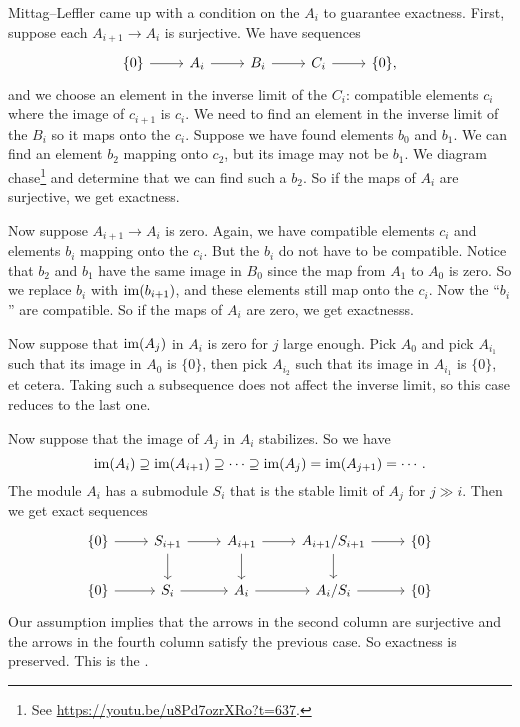 \documentclass[11pt, oneside,margin=1in]{article}
\begin{document}
Mittag--Leffler came up with a condition on the $A_i$ to guarantee exactness. First, suppose each $A_{i+1} \longrightarrow A_i$ is surjective. We have sequences 
\[
\begin{tikzcd}
	\{0\} \arrow[r] & A_i \arrow[r] & B_i \arrow[r] & C_i \arrow[r] &\{0\},
\end{tikzcd}
\]
and we choose an element in the inverse limit of the $C_i$: compatible elements $c_i$ where the image of $c_{i+1}$ is $c_i$. We need to find an element in the inverse limit of the $B_i$ so it maps onto the $c_i$. Suppose we have found elements $b_0$ and $b_1$. We can find an element $b_2$ mapping onto $c_2$, but its image may not be $b_1$. We diagram chase\footnote{See \url{https://youtu.be/u8Pd7ozrXRo?t=637}.} and determine that we can find such a $b_2$. So if the maps of $A_i$ are surjective, we get exactness. 

Now suppose $A_{i+1} \longrightarrow  A_i$ is zero. Again, we have compatible elements $c_i$ and elements $b_i$ mapping onto the $c_i$. But the $b_i$ do not have to be compatible. Notice that $b_2$ and $b_1$ have the same image in $B_0$ since the map from $A_1$ to $A_0$ is zero. So we replace $b_i$ with $\operatorname{im} (b_{i+1})$, and these elements still map onto the $c_i$. Now the ``$b_i$'' are compatible. So if the maps of $A_i$ are zero, we get exactnesss.

Now suppose that $\operatorname{im}(A_j)$ in $A_i$ is zero for $j$ large enough. Pick $A_0$ and pick $A_{i_1}$ such that its image in $A_0$ is $\{0\}$, then pick $A_{i_2}$ such that its image in $A_{i_1}$ is $\{0\}$, et cetera. Taking such a subsequence does not affect the inverse limit, so this case reduces to the last one. 

Now suppose that the image of $A_j$ in $A_i$ stabilizes. So we have
$$
\operatorname{im}(A_i) \supseteq \operatorname{im} (A_{i+1}) \supseteq \cdots \supseteq \operatorname{im} (A_j) = \operatorname{im}  (A_{j+1}) = \cdots.
$$
The module $A_i$ has a submodule $S_i$ that is the stable limit of $A_j$ for $j\gg i$. Then we get exact sequences
\[
\begin{tikzcd}
	\{0\} \arrow[r] & S_{i+1} \arrow[r] \arrow[d] & A_{i+1} \arrow[r] \arrow[d] & A_{i+1}/S_{i+1} \arrow[r] \arrow[d] & \{0\}\\
	\{0\} \arrow[r] & S_i \arrow[r] & A_i \arrow[r] & A_i/S_i \arrow[r] & \{0\}
\end{tikzcd}
\]
Our assumption implies that the arrows in the second column are surjective and the arrows in the fourth column satisfy the previous case. So exactness is preserved. This is the .
\end{document}
